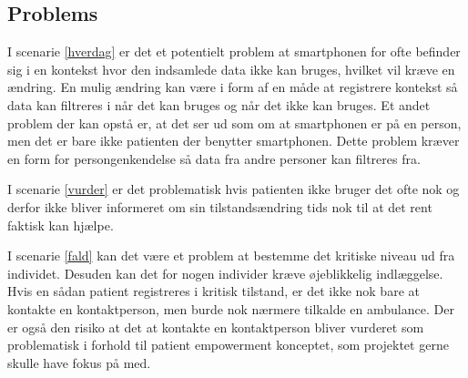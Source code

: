\subsection{Problems}
I scenarie \ref{hverdag} er det et potentielt problem at smartphonen for ofte befinder sig i en kontekst hvor den indsamlede data ikke kan bruges, hvilket vil kræve en ændring.
En mulig ændring kan være i form af en måde at registrere kontekst så data kan filtreres i når det kan bruges og når det ikke kan bruges.
Et andet problem der kan opstå er, at det ser ud som om at smartphonen er på en person, men det er bare ikke patienten der benytter smartphonen.
Dette problem kræver en form for persongenkendelse så data fra andre personer kan filtreres fra.

I scenarie \ref{vurder} er det problematisk hvis patienten ikke bruger det ofte nok og derfor ikke bliver informeret om sin tilstandsændring tids nok til at det rent faktisk kan hjælpe.

I scenarie \ref{fald} kan det være et problem at bestemme det kritiske niveau ud fra individet.
Desuden kan det for nogen individer kræve øjeblikkelig indlæggelse.
Hvis en sådan patient registreres i kritisk tilstand, er det ikke nok bare at kontakte en kontaktperson, men burde nok nærmere tilkalde en ambulance.
Der er også den risiko at det at kontakte en kontaktperson bliver vurderet som problematisk i forhold til patient empowerment konceptet, som projektet gerne skulle have fokus på med. 

